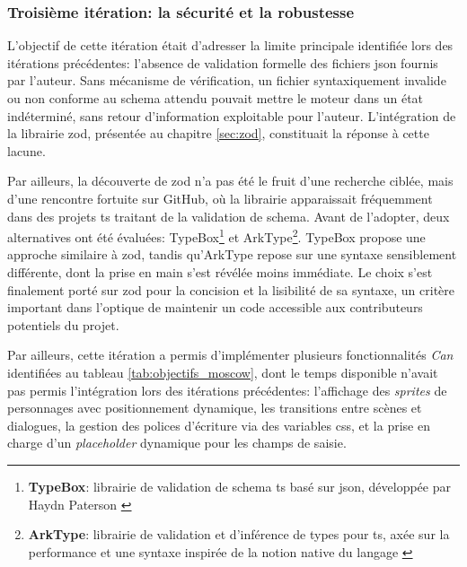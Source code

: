 \subsubsection{Troisième itération: la sécurité et la robustesse}


L'objectif de cette itération était d'adresser la limite principale identifiée lors des itérations précédentes: l'absence de validation formelle des fichiers \acrshort{json} fournis par l'auteur. Sans mécanisme de vérification, un fichier syntaxiquement  invalide ou non conforme au \gls{schema} attendu pouvait mettre le moteur dans un état indéterminé, sans retour d'information exploitable pour l'auteur. L'intégration de la \gls{librairie} \gls{zod}, présentée au chapitre \ref{sec:zod}, constituait la réponse à cette lacune.

Par ailleurs, la découverte de \gls{zod} n'a pas été le fruit d'une recherche ciblée, mais d'une rencontre fortuite sur GitHub, où la \gls{librairie} apparaissait fréquemment dans des projets \gls{ts} traitant de la validation de \gls{schema}. Avant de l'adopter, deux alternatives ont été évaluées: TypeBox\footnote{\textbf{TypeBox}: \gls{librairie} de validation de \gls{schema} \gls{ts} basé sur \gls{json}, développée par Haydn Paterson \parencite{noauthor_typebox_nodate}}  et ArkType\footnote{\textbf{ArkType}: \gls{librairie} de validation et d'inférence de types pour \gls{ts}, axée sur la performance et une \gls{syntaxe} inspirée de la notion native du langage \parencite{noauthor_arktype_nodate}}. TypeBox propose une approche similaire à \gls{zod}, tandis qu'ArkType repose sur une \gls{syntaxe} sensiblement différente, dont la prise en main s'est révélée moins immédiate. Le choix s'est finalement porté sur \gls{zod} pour la concision et la lisibilité de sa \gls{syntaxe}, un critère important dans l'optique de maintenir un code accessible aux contributeurs potentiels du projet.

Par ailleurs, cette itération a permis d'implémenter plusieurs fonctionnalités \textit{Can} identifiées au tableau \ref{tab:objectifs_moscow}, dont le temps disponible n'avait pas permis l'intégration lors des itérations précédentes: l'affichage des \textit{sprites} de personnages avec positionnement dynamique, les transitions entre scènes et dialogues, la gestion des polices d'écriture via des variables \acrshort{css}, et la prise en charge d'un \textit{placeholder} dynamique pour les champs de saisie.



